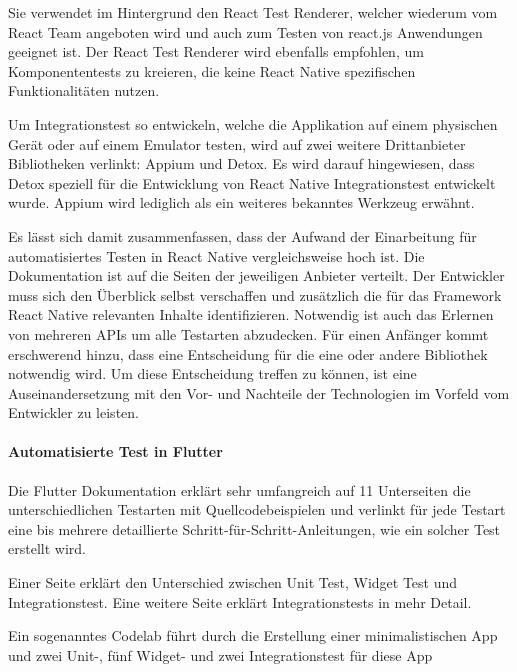 Sie verwendet im Hintergrund den React Test Renderer, welcher wiederum vom React Team angeboten wird und auch zum Testen von react.js Anwendungen geeignet ist. Der React Test Renderer wird ebenfalls empfohlen, um Komponententests zu kreieren, die keine React Native spezifischen Funktionalitäten nutzen.

Um Integrationstest so entwickeln, welche die Applikation auf einem physischen Gerät oder auf einem Emulator testen, wird auf zwei weitere Drittanbieter Bibliotheken verlinkt: Appium und Detox. Es wird darauf hingewiesen, dass Detox speziell für die Entwicklung von React Native Integrationstest entwickelt wurde. Appium wird lediglich als ein weiteres  bekanntes Werkzeug erwähnt. 

Es lässt sich damit zusammenfassen, dass der Aufwand der Einarbeitung für automatisiertes Testen in React Native vergleichsweise hoch ist. Die Dokumentation ist auf die Seiten der jeweiligen Anbieter verteilt. Der Entwickler muss sich den Überblick selbst verschaffen und zusätzlich die für das Framework React Native relevanten Inhalte identifizieren. Notwendig ist auch das Erlernen von mehreren APIs um alle Testarten abzudecken. Für einen Anfänger kommt erschwerend hinzu, dass eine Entscheidung für die eine oder andere Bibliothek notwendig wird. Um diese Entscheidung treffen zu können, ist eine Auseinandersetzung mit den Vor- und Nachteile der Technologien im Vorfeld vom Entwickler zu leisten.

\paragraph{Automatisierte Test in Flutter} Die Flutter Dokumentation erklärt sehr umfangreich auf 11 Unterseiten die unterschiedlichen Testarten mit Quellcodebeispielen und verlinkt für jede Testart eine bis mehrere detaillierte Schritt-für-Schritt-Anleitungen, wie ein solcher Test erstellt wird.

Einer Seite erklärt den Unterschied zwischen Unit Test, Widget Test und Integrationstest. Eine weitere Seite erklärt Integrationstests in mehr Detail. 

Ein sogenanntes Codelab führt durch die Erstellung einer minimalistischen App und zwei Unit-, fünf Widget- und zwei Integrationstest für diese App

